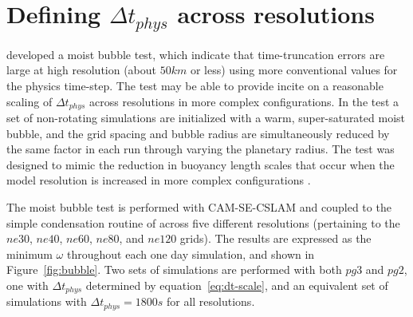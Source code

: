 \documentclass{agujournal}
\begin{document}

%
%
%
%
\appendix
\section{Defining $\Delta t_{phys}$ across resolutions}\label{sec:app1}
 \cite{HR2018JAMES} developed a moist bubble test, which indicate that time-truncation errors are large at high resolution (about $50km$ or less) using more conventional values for the physics time-step. The test may be able to provide incite on a reasonable scaling of $\Delta t_{phys}$ across resolutions in more complex configurations. In the test a set of non-rotating simulations are initialized with a warm, super-saturated moist bubble, and the grid spacing and bubble radius are simultaneously reduced by the same factor in each run through varying the planetary radius. The test was designed to mimic the reduction in buoyancy length scales that occur when the model resolution is increased in more complex configurations \citep{HETAL2006JCLIM,HR2018JAMES}. 
 
The moist bubble test is performed with CAM-SE-CSLAM and coupled to the simple condensation routine of \cite{K1969MM} across five different resolutions (pertaining to the $ne30$, $ne40$, $ne60$, $ne80$, and $ne120$ grids). The results are expressed as the minimum $\omega$ throughout each one day simulation, and shown in Figure~\ref{fig:bubble}. Two sets of simulations are performed with both $pg3$ and $pg2$, one with $\Delta t_{phys}$ determined by equation~\ref{eq:dt-scale}, and an equivalent set of simulations with $\Delta t_{phys} = 1800s$ for all resolutions. 
\end{document}
